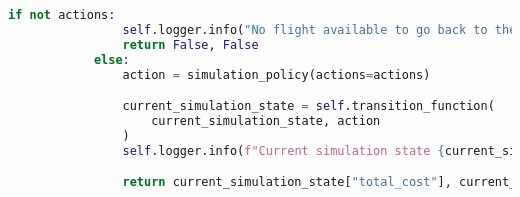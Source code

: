 \begin{lstlisting}[language = Python]
            if not actions:
                self.logger.info("No flight available to go back to the initial area")
                return False, False
            else:
                action = simulation_policy(actions=actions)

                current_simulation_state = self.transition_function(
                    current_simulation_state, action
                )
                self.logger.info(f"Current simulation state {current_simulation_state}")

                return current_simulation_state["total_cost"], current_simulation_state

\end{lstlisting}